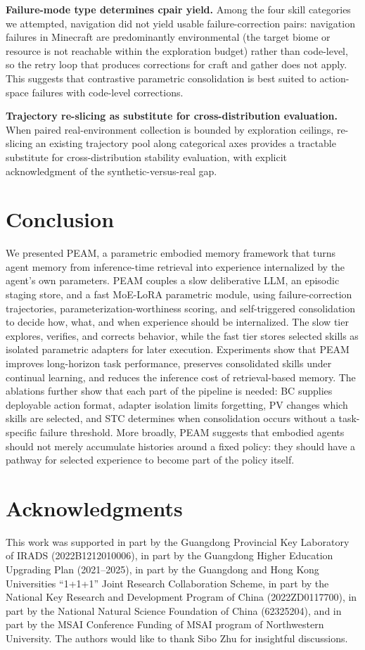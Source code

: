 \documentclass[11pt]{article}
\begin{document}
\textbf{Failure-mode type determines cpair yield.} Among the four skill categories we attempted, navigation did not yield usable failure-correction pairs: navigation failures in Minecraft are predominantly environmental (the target biome or resource is not reachable within the exploration budget) rather than code-level, so the retry loop that produces corrections for craft and gather does not apply. This suggests that contrastive parametric consolidation is best suited to action-space failures with code-level corrections. 

\textbf{Trajectory re-slicing as substitute for cross-distribution evaluation.} When paired real-environment collection is bounded by exploration ceilings, re-slicing an existing trajectory pool along categorical axes provides a tractable substitute for cross-distribution stability evaluation, with explicit acknowledgment of the synthetic-versus-real gap.


\section{Conclusion}

We presented PEAM, a parametric embodied memory framework that turns agent memory from inference-time retrieval into experience internalized by the agent's own parameters. PEAM couples a slow deliberative LLM, an episodic staging store, and a fast MoE-LoRA parametric module, using failure-correction trajectories, parameterization-worthiness scoring, and self-triggered consolidation to decide how, what, and when experience should be internalized. The slow tier explores, verifies, and corrects behavior, while the fast tier stores selected skills as isolated parametric adapters for later execution. Experiments show that PEAM improves long-horizon task performance, preserves consolidated skills under continual learning, and reduces the inference cost of retrieval-based memory. The ablations further show that each part of the pipeline is needed: BC supplies deployable action format, adapter isolation limits forgetting, PV changes which skills are selected, and STC determines when consolidation occurs without a task-specific failure threshold. More broadly, PEAM suggests that embodied agents should not merely accumulate histories around a fixed policy: they should have a pathway for selected experience to become part of the policy itself.

\section*{Acknowledgments}
This work was supported in part by the Guangdong Provincial Key Laboratory of IRADS (2022B1212010006), in part by the Guangdong Higher Education Upgrading Plan (2021–2025), in part by the Guangdong and Hong Kong Universities “1+1+1” Joint Research Collaboration Scheme, in part by the National Key Research and Development Program of China (2022ZD0117700), in part by the National Natural Science Foundation of China (62325204), and in part by the MSAI Conference Funding of MSAI program of Northwestern University. The authors would like to thank Sibo Zhu for insightful discussions.
\end{document}
